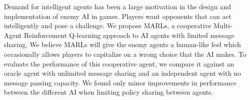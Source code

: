 {Demand for intelligent agents has been a large motivation in the design and implementation of enemy AI in games. Players want opponents that can act intelligently and pose a challenge. We propose MARLs, a cooperative Multi-Agent Reinforcement Q-learning approach to AI agents with limited message sharing. We believe MARLs will give the enemy agents a human-like feel which occasionally allows players to capitalize on a wrong choice that the AI makes. To evaluate the performance of this cooperative agent, we compare it against an oracle agent with unlimited message sharing and an independent agent with no message passing capacity. We found only minor improvements in performance between the different AI when limiting policy sharing between agents.
}













